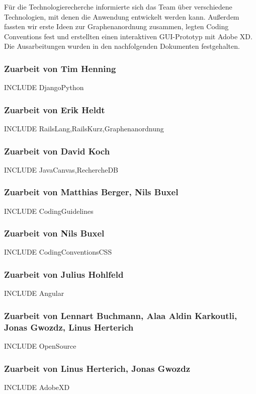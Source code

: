 \documentclass[twoside]{report}
\begin{document}
Für die Technologierecherche informierte sich das Team über verschiedene Technologien, mit denen die Anwendung entwickelt werden kann. Außerdem fassten wir erste Ideen zur Graphenanordnung zusammen, legten Coding Conventions fest und erstellten einen interaktiven GUI-Prototyp mit Adobe XD. Die Ausarbeitungen wurden in den nachfolgenden Dokumenten festgehalten.

\subsubsection{Zuarbeit von Tim Henning}
INCLUDE DjangoPython

\subsubsection{Zuarbeit von Erik Heldt}
INCLUDE RailsLang,RailsKurz,Graphenanordnung

\subsubsection{Zuarbeit von David Koch}
INCLUDE JavaCanvas,RechercheDB

\subsubsection{Zuarbeit von Matthias Berger, Nils Buxel}
INCLUDE CodingGuidelines

\subsubsection{Zuarbeit von Nils Buxel}
INCLUDE CodingConventionsCSS

\subsubsection{Zuarbeit von Julius Hohlfeld}
INCLUDE Angular

\subsubsection{Zuarbeit von Lennart Buchmann, Alaa Aldin Karkoutli, Jonas Gwozdz, Linus Herterich}
INCLUDE OpenSource

\subsubsection{Zuarbeit von Linus Herterich, Jonas Gwozdz}
INCLUDE AdobeXD
\end{document}
